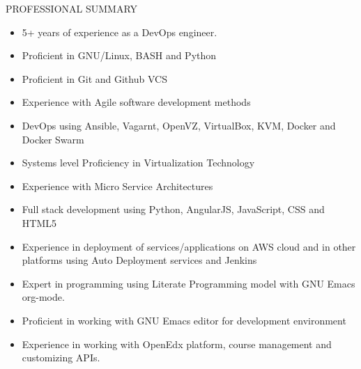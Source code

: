 \documentclass{resume} %
\begin{document}
\begin{rSection}{PROFESSIONAL SUMMARY}
  
  \begin{itemize}
    
  \item 5+ years of experience as a DevOps engineer.

  \item Proficient in GNU/Linux, BASH and Python

  \item Proficient in Git and Github VCS

  \item Experience with Agile software development methods

  \item DevOps using Ansible, Vagarnt, OpenVZ, VirtualBox,
    KVM, Docker and Docker Swarm

  \item Systems level Proficiency in Virtualization
        Technology
  
  \item Experience with Micro Service Architectures

  \item Full stack development using Python, AngularJS, JavaScript, CSS and HTML5

  \item Experience in deployment of services/applications on AWS cloud
    and in other platforms using Auto Deployment services and Jenkins 

  \item Expert in programming using Literate Programming model with
    GNU Emacs org-mode.

  \item Proficient in working with GNU Emacs editor for development
    environment
    
  \item Experience in working with OpenEdx platform, course
    management and customizing APIs.

  \end{itemize}

\end{rSection}

\end{document}
